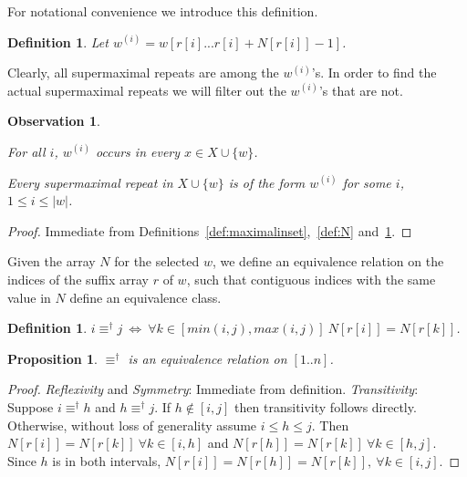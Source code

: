 \documentclass[submission]{dmtcs}
\newcommand\+[1]{\mathcal{#1}}
\newtheorem{observation}[theorem]{Observation}
\newtheorem{definition}[theorem]{Definition}
\newtheorem{proposition}[theorem]{Proposition}
\newenvironment{my_enumerate}{\begin{enumerate}
  \setlength{\itemsep}{1pt}
  \setlength{\parskip}{0pt}
  \setlength{\parsep}{0pt}}{\end{enumerate}}
\begin{document}
For notational convenience we introduce this definition.

\begin{definition}\label{def:wi}
Let $w^{(i)} = w[r[i]... r[i]+N[r[i]]-1]$.
\end{definition}

Clearly, all supermaximal repeats are 
among the  $w^{(i)}$'s.
In order to find the actual supermaximal repeats 
we will filter out the $w^{(i)}$'s that are not.

\begin{observation}\label{obs:form_} \
\begin{my_enumerate}
\item For all $i$, $w^{(i)}$ occurs in every $x\in X \cup\{w\}$.

\item  Every  supermaximal repeat in $ X \cup\{w\}$
       is of the form  $w^{(i)}$ for some $i$, $1\leq i\leq |w|$.
\end{my_enumerate}
\end{observation}
\begin{proof}
Immediate from Definitions~\ref{def:maximalinset},~\ref{def:N} 
and~\ref{def:wi}.
\end{proof}

Given the array $N$ for the selected $w$, 
we define an equivalence relation 
on the indices of the suffix array $r$ of $w$,
such that contiguous indices with the same value in $N$ 
define an equivalence class.

\begin{definition}\label{def:equivdag}
$i \equiv^\dag j \ \Leftrightarrow \ 
\forall k\in [min(i,j), max(i,j)]\  N[r[i]] = N[r[k]]$.
\end{definition}

\begin{proposition}
$\equiv^\dag$ is an equivalence relation on $[1..n]$.
\end{proposition}

\begin{proof}
{\em Reflexivity} and {\em Symmetry}: Immediate from definition.
{\em Transitivity}:
Suppose $i \equiv^\dag h$ and $h \equiv^\dag j$.
If $h \not\in [i,j]$ then transitivity follows directly.
Otherwise, without loss of generality assume $i\leq h\leq j$.
Then $N[r[i]] =N[r[k]] \ \forall k\in [i, h]$ 
and $N[r[h]] = N[r[k]] \ \forall k\in [h,j]$.
Since $h$ is in both intervals, $ N[r[i]] = N[r[h]] = N[r[k]],
\ \forall k\in [i, j]$.
\end{proof}
\end{document}
